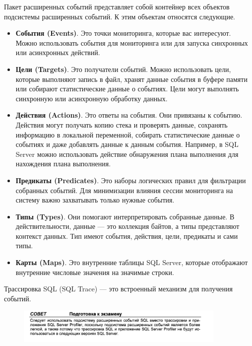 Пакет расширенных событий представляет собой контейнер всех объектов подсистемы расширенных событий. К этим объектам относятся следующие. 

\begin{itemize}
	\item \textbf{События (Events)}. Это точки мониторинга, которые вас интересуют. Можно
	использовать события для мониторинга или для запуска синхронных или асинхронных действий. 
	\item \textbf{Цели (Targets)}. Это получатели событий. Можно использовать цели, которые
	выполняют запись в файл, хранят данные события в буфере памяти или собирают статистические данные о событиях. Цели могут выполнять синхронную или
	асинхронную обработку данных.
	\item \textbf{Действия (Actions)}. Это ответы на события. Они привязаны к событию. Действия могут получать копию стека и проверять данные, сохранять информацию в
	локальной переменной, собирать статистические данные о событиях и даже добавлять данные к данным события. Например, в SQL Server можно использовать
	действие обнаружения плана выполнения для нахождения плана выполнения. 
	\item \textbf{Предикаты (Predicates)}. Это наборы логических правил для фильтрации собранных событий. Для минимизации влияния сессии мониторинга на систему
	важно захватывать только нужные события. 
	\item \textbf{Типы (Types)}. Они помогают интерпретировать собранные данные. В действительности, данные — это коллекция байтов, а типы представляют контекст данных. Тип имеют события, действия, цели, предикаты и сами типы. 
	\item \textbf{Карты (Maps)}. Это внутренние таблицы SQL Server, которые отображают внутренние числовые значения на значимые строки. 
\end{itemize}

Трассировка SQL (SQL Trace) — это встроенный механизм для получения
событий. 

\begin{figure}[h!]
	\begin{center}
		\includegraphics[width=0.9\textwidth]{img/advice40.png}
	\end{center}
	\captionsetup{justification=centering}
\end{figure}


